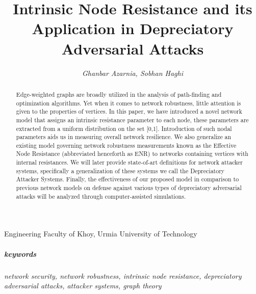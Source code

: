 \documentclass{article}
\date{\vspace{-4ex}}
\begin{document}
	\title{\textbf{Intrinsic Node Resistance and its Application in Depreciatory Adversarial Attacks}}
	\author{\emph{Ghanbar Azarnia, Sobhan Haghi}}
	\maketitle
	
	\large{Engineering Faculty of Khoy, Urmia University of Technology}\\
	
	\begin{abstract}
		Edge-weighted graphs are broadly utilized in the analysis of path-finding and optimization algorithms. Yet when it comes to network robustness, little attention is given to the properties of vertices. In this paper, we have introduced a novel network model that assigns an intrinsic resistance parameter to each node, these parameters are extracted from a uniform distribution on the set [0,1]. Introduction of such nodal parameters aids us in measuring overall network resilience. We also generalize an existing model governing network robustness measurements known as the Effective Node Resistance (abbreviated henceforth as ENR) to networks containing vertices with internal resistances. We will later provide state-of-art definitions for network attacker systems, specifically a generalization of these systems we call the Depreciatory Attacker Systems. Finally, the effectiveness of our proposed model in comparison to previous network models on defense against various types of depreciatory adversarial attacks will be analyzed through computer-assisted simulations.
	\end{abstract}
	
	\subparagraph{keywords}\textit{network security, network robustness, intrinsic node resistance, depreciatory adversarial attacks, attacker systems, graph theory}
	
\end{document}
